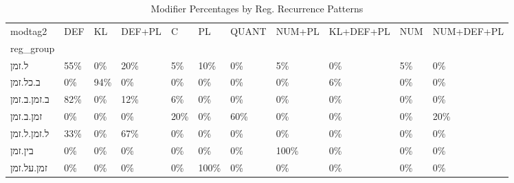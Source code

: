 \begin{table}[htbp!]
\centering
\caption{Modifier Percentages by Reg. Recurrence Patterns}
\label{table:regrecmod_pc}
\begin{adjustbox}{width=1\textwidth}
\begin{tabular}{lllllllllll}
\toprule
modtag2 &  DEF &   KL & DEF+PL &    C &    PL & QUANT & NUM+PL & KL+DEF+PL & NUM & NUM+DEF+PL \\
reg\_group   &      &      &        &      &       &       &        &           &     &            \\
\midrule
ל.זמן       &  55\% &   0\% &    20\% &   5\% &   10\% &    0\% &     5\% &        0\% &  5\% &         0\% \\
ב.כל.זמן    &   0\% &  94\% &     0\% &   0\% &    0\% &    0\% &     0\% &        6\% &  0\% &         0\% \\
ב.זמן.ב.זמן &  82\% &   0\% &    12\% &   6\% &    0\% &    0\% &     0\% &        0\% &  0\% &         0\% \\
זמן.ב.זמן   &   0\% &   0\% &     0\% &  20\% &    0\% &   60\% &     0\% &        0\% &  0\% &        20\% \\
ל.זמן.ל.זמן &  33\% &   0\% &    67\% &   0\% &    0\% &    0\% &     0\% &        0\% &  0\% &         0\% \\
בין.זמן     &   0\% &   0\% &     0\% &   0\% &    0\% &    0\% &   100\% &        0\% &  0\% &         0\% \\
זמן.על.זמן  &   0\% &   0\% &     0\% &   0\% &  100\% &    0\% &     0\% &        0\% &  0\% &         0\% \\
\bottomrule
\end{tabular}
\end{adjustbox}
\end{table}
